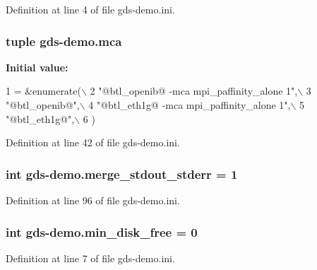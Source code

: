 Definition at line 4 of file gds-\/demo.\-ini.

\hypertarget{namespacegds-demo_ae28af619e6658a48dc7674284fbde2e0}{
\subsubsection[{mca}]{\setlength{\rightskip}{0pt plus 5cm}tuple gds-\/demo.\-mca}}\label{namespacegds-demo_ae28af619e6658a48dc7674284fbde2e0}
{\bfseries Initial value\-:}
\begin{DoxyCode}
1 = &enumerate(\(\backslash\)
2         \textcolor{stringliteral}{"@btl\_openib@ -mca mpi\_paffinity\_alone 1"},\(\backslash\)
3         \textcolor{stringliteral}{"@btl\_openib@"},\(\backslash\)
4         \textcolor{stringliteral}{"@btl\_eth1g@ -mca mpi\_paffinity\_alone 1"},\(\backslash\)
5         \textcolor{stringliteral}{"@btl\_eth1g@"},\(\backslash\)
6         )
\end{DoxyCode}


Definition at line 42 of file gds-\/demo.\-ini.

\hypertarget{namespacegds-demo_a63b96d5e04e7011c1bd63a5a9a862199}{
\subsubsection[{merge\-\_\-stdout\-\_\-stderr}]{\setlength{\rightskip}{0pt plus 5cm}int gds-\/demo.\-merge\-\_\-stdout\-\_\-stderr = 1}}\label{namespacegds-demo_a63b96d5e04e7011c1bd63a5a9a862199}


Definition at line 96 of file gds-\/demo.\-ini.

\hypertarget{namespacegds-demo_a18c78141084f23069438c080ec110e3c}{
\subsubsection[{min\-\_\-disk\-\_\-free}]{\setlength{\rightskip}{0pt plus 5cm}int gds-\/demo.\-min\-\_\-disk\-\_\-free = 0}}\label{namespacegds-demo_a18c78141084f23069438c080ec110e3c}


Definition at line 7 of file gds-\/demo.\-ini.

